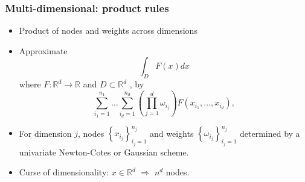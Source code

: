 \documentclass[bigger,handout]{beamer}
\newenvironment{stepitemize}{\begin{itemize}[<+->]}{\end{itemize} }
\begin{document}
\begin{frame}%

\frametitle{Multi-dimensional: product rules}

\begin{stepitemize}
\item Product of nodes and weights across dimensions

\item Approximate 
\begin{equation*}
\int_{D}F(x)dx
\end{equation*}%
where $F:\mathbb{R}^{d}\rightarrow \mathbb{R}$ and $D\subset \mathbb{R}^{d}$%
, by 
\begin{equation*}
\sum_{i_{1}=1}^{n_{1}}\ldots \sum_{i_{d}=1}^{n_{d}}\left(
\prod_{j=1}^{d}\omega _{i_{j}}\right) F(x_{i_{1}},\ldots ,x_{i_{d}}),
\end{equation*}

\item For dimension $j$, nodes $\left\{ x_{i_{j}}\right\} _{i_{j}=1}^{n_{j}}$
and weights $\left\{ \omega _{i_{j}}\right\} _{i_{j}=1}^{n_{j}}$ determined
by a univariate Newton-Cotes or Gaussian scheme.

\item Curse of dimensionality: $x\in \mathbb{R}^{d}$ $\Rightarrow $ $n^{d}$
nodes.
\end{stepitemize}


\end{frame}%
\end{document}
